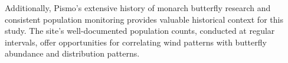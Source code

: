 Additionally, Pismo's extensive history of monarch butterfly research and consistent population monitoring provides valuable historical context for this study. The site's well-documented population counts, conducted at regular intervals, offer opportunities for correlating wind patterns with butterfly abundance and distribution patterns.

